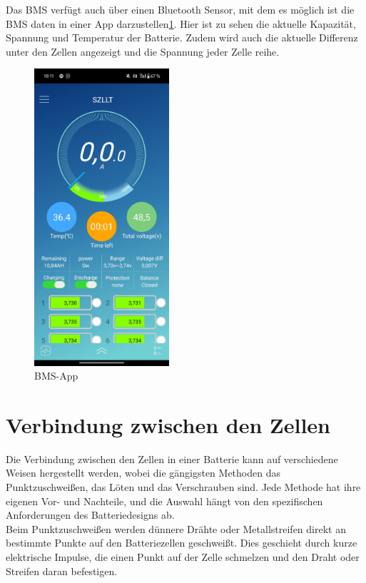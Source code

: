 Das BMS verfügt auch über einen Bluetooth Sensor, mit dem es möglich ist die BMS daten in einer App darzustellen\ref{fig:21}.
Hier ist zu sehen die aktuelle Kapazität, Spannung und Temperatur der Batterie.
Zudem wird auch die aktuelle Differenz unter den Zellen angezeigt und die Spannung jeder Zelle reihe.
\begin{figure}[h]
    \centering
    \includegraphics[width=5cm]{images/BMS}
    \caption{BMS-App\cite{lorenz_scherrer_selbst_2023}}%
    \label{fig:21}
\end{figure}


\section{Verbindung zwischen den Zellen}

Die Verbindung zwischen den Zellen in einer Batterie kann auf verschiedene Weisen hergestellt werden, wobei die gängigsten Methoden das Punktzuschweißen, das Löten und das Verschrauben sind.
Jede Methode hat ihre eigenen Vor- und Nachteile, und die Auswahl hängt von den spezifischen Anforderungen des Batteriedesigns ab.\\

Beim Punktzuschweißen werden dünnere Drähte oder Metallstreifen direkt an bestimmte Punkte auf den Batteriezellen geschweißt.
Dies geschieht durch kurze elektrische Impulse, die einen Punkt auf der Zelle schmelzen und den Draht oder Streifen daran befestigen.\\

